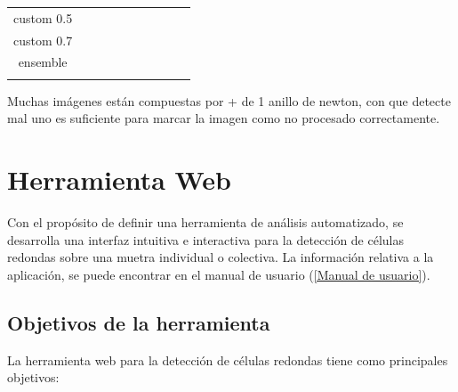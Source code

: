 \documentclass[12pt,a4paper,onecolumn,oneside]{report}
\begin{document}
\begin{table}[ht]
{\begin{tabular}{!{\vrule width 1.2pt}c|c|c|c|c|c|c|c|c|c!{\vrule width 1.2pt}}
\hline
custom 0.5        &  &  &  &  &  &  &  &  &  \\
\hline
custom 0.7        &  &  &  &  &  &  &  &  &  \\
\hline
ensemble       &  &  &  &  &  &  &  &  &  \\
\hline
\end{tabular}
}
\end{table}


Muchas imágenes están compuestas por + de 1 anillo de newton, con que detecte mal uno es suficiente para marcar la imagen como no procesado correctamente.

\chapter{Herramienta Web} %
\label{Herramienta web}
Con el propósito de definir una herramienta de análisis automatizado, se desarrolla una interfaz intuitiva e interactiva para la detección 
de células redondas sobre una muetra individual o colectiva. La información relativa a la aplicación,
se puede encontrar en el manual de usuario (\ref{Manual de usuario}).
\section{Objetivos de la herramienta}
\label{sec:Objetivos de la herramienta}

La herramienta web para la detección de células redondas tiene como principales objetivos:
\end{document}
